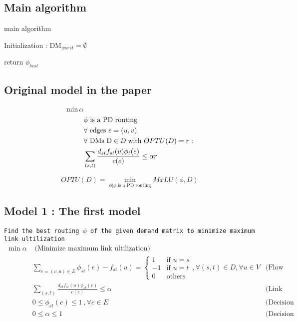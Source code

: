 \documentclass{ctexart}
\begin{document}
\subsection{Main algorithm} 
\begin{algorithm}[H]
    \SetAlgoLined 
	\caption{main algorithm}%
	Initialization : DM$_{worst} = \emptyset $\; 

	return $\phi_{best}$
\end{algorithm}

\subsection{Original model in the paper} 
\begin{equation}
	\begin{aligned}
		\min \alpha & \\
		& \phi \text{ is a PD routing}\\
		& \forall \text{ edges }e=(u,v) \\
		& \forall \text{ DMs D}\in \text{\sl D}\text{ with }OPTU(D)=r:\\
		& \sum_{(s,t)}\frac{d_{st}f_{st}(u)\phi_t(e)}{c(e)}\leq\alpha r
	\end{aligned}
\end{equation}

\begin{equation}
	OPTU(D)=\min_{\phi|\phi\text{ is a PD routing}} MxLU(\phi,D)
\end{equation}

\subsection{Model 1 : The first model}
\texttt{Find the best routing $\phi$ of the given demand matrix to minimize maximum link ultilization} 
\begin{equation}
	\begin{aligned}
		\min \alpha & \text{  (Minimize maximum link ultilization)}\\
		& \sum_{e=(v,u)\in E}\phi_{st}(e)-f_{st}(u)=\begin{cases}
			1 &\text{if } u=s \\
			-1 &\text{if } u=t \\
			0 &\text{others} 
		 \end{cases},\forall (s,t)\in D, \forall u\in V & \text{(Flow conservation)}\\
		& \sum_{(s,t)}\frac{
			d_{st}f_{st}(u)\phi_{st}(e)}{c(e)} \leq \alpha\ &  \text{(Link capacity constraint)} \\
		& 0\leq\phi_{st}(e)\leq1\ ,\forall e\in E\ & \text{(Decision variable constraint)}\\
		& 0\leq\alpha\leq1\ & \text{(Decision variable constraint)}
	\end{aligned}
\end{equation}
\end{document}
